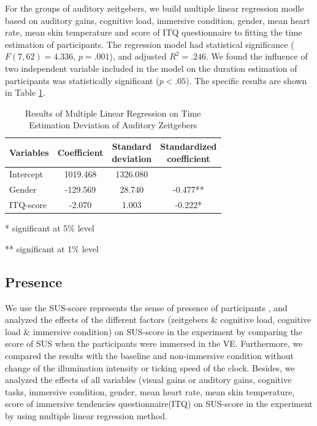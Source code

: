 \documentclass[sigconf]{acmart}
\begin{document}
For the groups of auditory zeitgebers, we build multiple linear regression modle based on auditory gains, cognitive load, immersive condition, gender, mean heart rate, mean skin temperature and score of ITQ questionnaire to fitting the time estimation of participants. The regression model had statistical significance ($F(7,62) = 4.336$, $p = .001$), and adjusted $R^2 = .246$. We found the influence of two independent variable included in the model on the duration estimation of participants was statistically significant ($p < .05$). The specific results are shown in Table \ref{tab:auditorytime}.

\begin{table}[htbp] %
 \centering\small
 \begin{threeparttable}
 \caption{Results of Multiple Linear Regression on Time Estimation Deviation of Auditory Zeitgebers}
 \label{regression}
  \begin{tabular}{lccc} %
  \toprule %
  Variables         & Coefficient & \makecell[c]{Standard\\ deviation} & \makecell[c]{Standardized\\ coefficient} \\
  \midrule %
  Intercept          & 1019.468 & 1326.080  &         \\
  Gender             & -129.569   & 28.740   & -0.477**  \\
  ITQ-score & -2.070   & 1.003   & -0.222*  \\
  \bottomrule %
 \end{tabular}
  \label{tab:auditorytime}
  \small
 \begin{tablenotes}
  \item[*] significant at 5\% level
  \item[**] significant at 1\% level
 \end{tablenotes}
 \end{threeparttable}
\end{table}

\subsection{Presence}

We use the SUS-score represents the sense of presence of participants \cite{Catena00usingpresence}, and analyzed the effects of the different factors (zeitgebers \& cognitive load, cognitive load \& immersive condition) on SUS-score in the experiment by comparing the score of SUS when the participants were immersed in the VE. Furthermore, we compared the results with the baseline and non-immersive condition without change of the illumination intensity or ticking speed of the clock.
Besides, we analyzed the effects of all variables (visual gains or auditory gains, cognitive tasks, immersive condition, gender,  mean heart rate, mean skin temperature, score of immersive tendencies questionnaire(ITQ) on SUS-score in the experiment by using multiple linear regression method.
\end{document}
